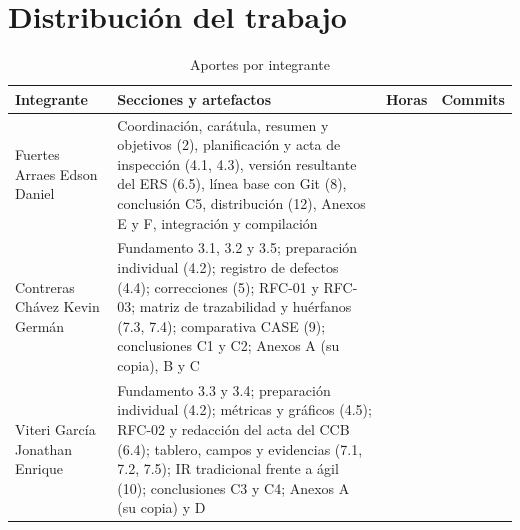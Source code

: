 \documentclass[journal,onecolumn]{IEEEtran}
\newcommand{\guia}[2]{%
	\begin{mdframed}[style=guia]
		\sloppy
		\noindent\textbf{Responsable: #1}\\[2pt]
		#2
	\end{mdframed}
}
\newif\ifguias
\let\guiaoriginal\guia
\renewcommand{\guia}[2]{\ifguias\guiaoriginal{#1}{#2}\fi}
\begin{document}
	\section{Distribución del trabajo}
	
	\begin{table}[H]
		\centering
		\caption{Aportes por integrante}
		\begin{tabular}{L{3.8cm} L{6.0cm} L{1.6cm} L{1.6cm}}
			\toprule
			\textbf{Integrante} & \textbf{Secciones y artefactos} & \textbf{Horas} &
			\textbf{Commits} \\
			\midrule
			Fuertes Arraes Edson Daniel &
			Coordinación, carátula, resumen y objetivos (2), planificación y acta de inspección
			(4.1, 4.3), versión resultante del ERS (6.5), línea base con Git (8), conclusión C5,
			distribución (12), Anexos E y F, integración y compilación & & \\
			\addlinespace
			Contreras Chávez Kevin Germán &
			Fundamento 3.1, 3.2 y 3.5; preparación individual (4.2); registro de defectos (4.4);
			correcciones (5); RFC-01 y RFC-03; matriz de trazabilidad y huérfanos (7.3, 7.4);
			comparativa CASE (9); conclusiones C1 y C2; Anexos A (su copia), B y C & & \\
			\addlinespace
			Viteri García Jonathan Enrique &
			Fundamento 3.3 y 3.4; preparación individual (4.2); métricas y gráficos (4.5);
			RFC-02 y redacción del acta del CCB (6.4); tablero, campos y evidencias
			(7.1, 7.2, 7.5); IR tradicional frente a ágil (10); conclusiones C3 y C4;
			Anexos A (su copia) y D & & \\
			\bottomrule
		\end{tabular}
	\end{table}
	
	\guia{Edson (Integrante 1)}{%
		Completar horas y número de commits con datos \textbf{reales}. La rúbrica exige que esta
		tabla sea \textbf{contrastable con el historial de commits}: si aquí dice que Jonathan
		trabajó 10 horas pero tiene un commit, la contradicción baja C7 y afecta el FAI individual.
		Recordar que el FAI (0,70--1,00) se aplica \textbf{por persona}: no es una nota de equipo.
		Las 8 horas de la práctica se reparten aproximadamente en 2,0~h de inspección, 1,5~h de CCB,
		1,5~h de trazabilidad, 0,75~h de baseline, 0,75~h de comparativa y 1,5~h de redacción.}
	
	\printbibliography[title={Referencias}]
	
\end{document}
